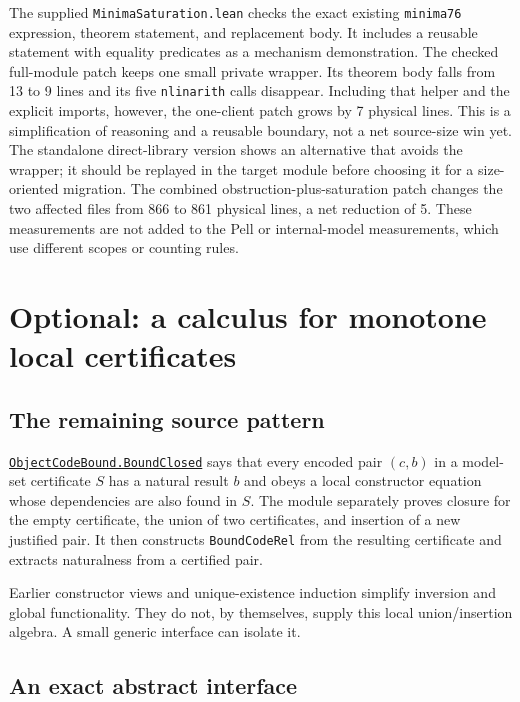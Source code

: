 \documentclass[11pt,letterpaper]{article}
\newcommand{\code}[1]{\nolinkurl{#1}}
\newcommand{\src}[2]{\href{https://github.com/VladimirReshetnikov/ProveIt/blob/9bd29079d5e1c6cc1c0bcaee6cb57d59b835cba9/Computability/DiophantineConsistency/Lean/DiophantineConsistency/#1.lean}{\code{#1.#2}}}
\begin{document}
The supplied \code{MinimaSaturation.lean} checks the exact existing \code{minima76} expression, theorem statement, and replacement body. It includes a reusable statement with equality predicates as a mechanism demonstration. The checked full-module patch keeps one small private wrapper. Its theorem body falls from 13 to 9 lines and its five \code{nlinarith} calls disappear. Including that helper and the explicit imports, however, the one-client patch grows by 7 physical lines. This is a simplification of reasoning and a reusable boundary, not a net source-size win yet. The standalone direct-library version shows an alternative that avoids the wrapper; it should be replayed in the target module before choosing it for a size-oriented migration. The combined obstruction-plus-saturation patch changes the two affected files from 866 to 861 physical lines, a net reduction of 5. These measurements are not added to the Pell or internal-model measurements, which use different scopes or counting rules.

\section{Optional: a calculus for monotone local certificates}
\label{sec:closure}

\subsection{The remaining source pattern}

\src{ObjectCodeBound}{BoundClosed} says that every encoded pair $(c,b)$ in a model-set certificate $S$ has a natural result $b$ and obeys a local constructor equation whose dependencies are also found in $S$. The module separately proves closure for the empty certificate, the union of two certificates, and insertion of a new justified pair. It then constructs \code{BoundCodeRel} from the resulting certificate and extracts naturalness from a certified pair.

Earlier constructor views and unique-existence induction simplify inversion and global functionality. They do not, by themselves, supply this local union/insertion algebra. A small generic interface can isolate it.

\subsection{An exact abstract interface}
\end{document}
